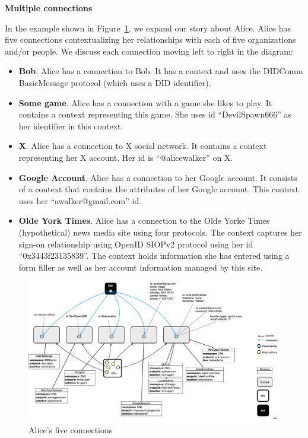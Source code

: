 \documentclass[11pt, oneside]{article}   	%
\begin{document}
\textbf{Multiple connections}

In the example shown in Figure~\ref{fig:groups}, we expand our story about Alice. Alice has five connections contextualizing her relationships with each of five organizations and/or people. We discuss each connection moving left to right in the diagram:

\begin{itemize}
	\item \textbf{Bob}. Alice has a connection to Bob. It has a   context and uses the DIDComm BasicMessage protocol (which uses a DID identifier).
	\item \textbf{Some game}. Alice has a connection with a game she likes to play. It contains a context representing this game. She uses id ``DevilSpawn666'' as her identifier in this context.  
	\item \textbf{X}. Alice has a connection to X social network. It contains a context representing her X account. Her id is ``@alicewalker'' on X.
	\item \textbf{Google Account}. Alice has a connection to her Google account. It consists of a context that contains the attributes of her Google account. This context uses her ``awalker@gmail.com'' id. 
	\item \textbf{Olde York Times}. Alice has a connection to the Olde Yorke Times (hypothetical) news media site using four protocols. The context captures her sign-on relationship using OpenID SIOPv2 protocol using her id ``0x3443f23135839''. The context holds information she has entered using a form filler as well as her account information managed by this site. 
\end{itemize}

\begin{figure}[htbp]
\includegraphics[width=\textwidth]{./images/multiple-connections.png}
\caption{Alice's five connections}
\label{fig:groups}
\end{figure}
\end{document}
